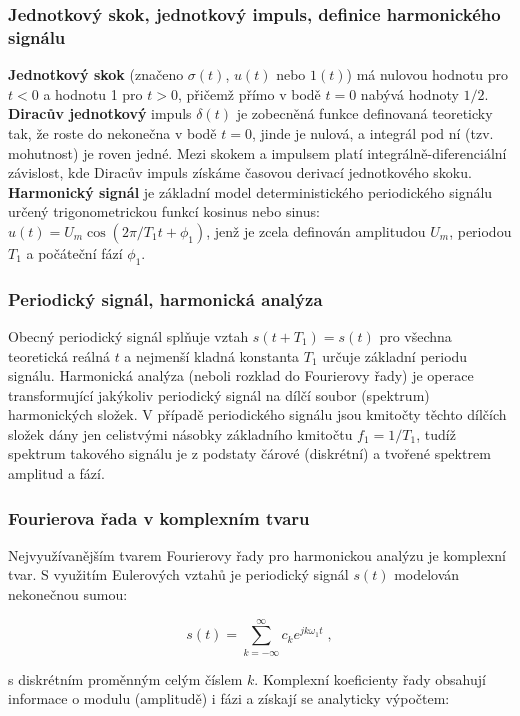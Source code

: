 	\subsubsection{Jednotkový skok, jednotkový impuls, definice harmonického signálu} 
		\textbf{Jednotkový skok} (značeno $\sigma(t)$, $u(t)$ nebo $1(t)$) má nulovou hodnotu pro $t < 0$ a hodnotu 1 pro $t > 0$, přičemž přímo v bodě $t = 0$ nabývá hodnoty $1/2$.\textbf{ Diracův jednotkový} impuls $\delta(t)$ je zobecněná funkce definovaná teoreticky tak, že roste do nekonečna v bodě $t = 0$, jinde je nulová, a integrál pod ní (tzv. mohutnost) je roven jedné. Mezi skokem a impulsem platí integrálně-diferenciální závislost, kde Diracův impuls získáme časovou derivací jednotkového skoku. \textbf{Harmonický signál} je základní model deterministického periodického signálu určený trigonometrickou funkcí kosinus nebo sinus: $u(t) = U_m \cos(2\pi/T_1 t + \phi_1)$, jenž je zcela definován amplitudou $U_m$, periodou $T_1$ a počáteční fází $\phi_1$.
	\subsubsection{Periodický signál, harmonická analýza}
		Obecný periodický signál splňuje vztah $s(t + T_1) = s(t)$ pro všechna teoretická reálná $t$ a nejmenší kladná konstanta $T_1$ určuje základní periodu signálu. Harmonická analýza (neboli rozklad do Fourierovy řady) je operace transformující jakýkoliv periodický signál na dílčí soubor (spektrum) harmonických složek. V případě periodického signálu jsou kmitočty těchto dílčích složek dány jen celistvými násobky základního kmitočtu $f_1 = 1/T_1$, tudíž spektrum takového signálu je z podstaty čárové (diskrétní) a tvořené spektrem amplitud a fází.
	
	\subsubsection{Fourierova řada v komplexním tvaru} 
		Nejvyužívanějším tvarem Fourierovy řady pro harmonickou analýzu je komplexní tvar. S využitím Eulerových vztahů je periodický signál $s(t)$ modelován nekonečnou sumou:
		
		\begin{equation*}
			s(t) = \sum_{k=-\infty}^{\infty} c_k e^{j k \omega_1 t} \;,
		\end{equation*}
		
		s diskrétním proměnným celým číslem $k$. Komplexní koeficienty řady obsahují informace o modulu (amplitudě) i fázi a získají se analyticky výpočtem:
		
